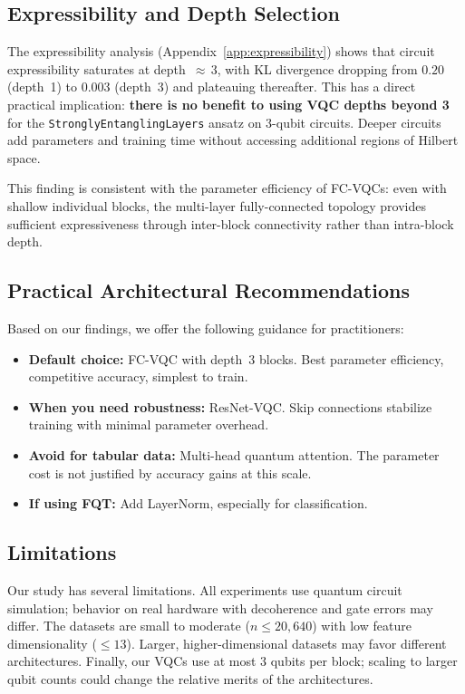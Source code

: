 \subsection{Expressibility and Depth Selection}

The expressibility analysis (Appendix~\ref{app:expressibility}) shows that
circuit expressibility saturates at depth~${\approx}\,3$, with KL divergence
dropping from $0.20$ (depth~1) to $0.003$ (depth~3) and plateauing
thereafter.  This has a direct practical implication: \textbf{there is no
benefit to using VQC depths beyond 3} for the \texttt{StronglyEntanglingLayers}
ansatz on 3-qubit circuits.  Deeper circuits add parameters and training
time without accessing additional regions of Hilbert space.

This finding is consistent with the parameter efficiency of FC-VQCs: even
with shallow individual blocks, the multi-layer fully-connected topology
provides sufficient expressiveness through inter-block connectivity rather
than intra-block depth.

\subsection{Practical Architectural Recommendations}

Based on our findings, we offer the following guidance for practitioners:

\begin{itemize}
  \item \textbf{Default choice:} FC-VQC with depth~3 blocks.  Best
    parameter efficiency, competitive accuracy, simplest to train.
  \item \textbf{When you need robustness:} ResNet-VQC.  Skip connections
    stabilize training with minimal parameter overhead.
  \item \textbf{Avoid for tabular data:} Multi-head quantum attention.
    The parameter cost is not justified by accuracy gains at this scale.
  \item \textbf{If using FQT:} Add LayerNorm, especially for classification.
\end{itemize}

\subsection{Limitations}

Our study has several limitations.  All experiments use quantum circuit
simulation; behavior on real hardware with decoherence and gate errors may
differ.  The datasets are small to moderate ($n \leq 20{,}640$) with low
feature dimensionality (${\leq}13$).  Larger, higher-dimensional datasets
may favor different architectures.  Finally, our VQCs use at most 3 qubits
per block; scaling to larger qubit counts could change the relative merits
of the architectures.
